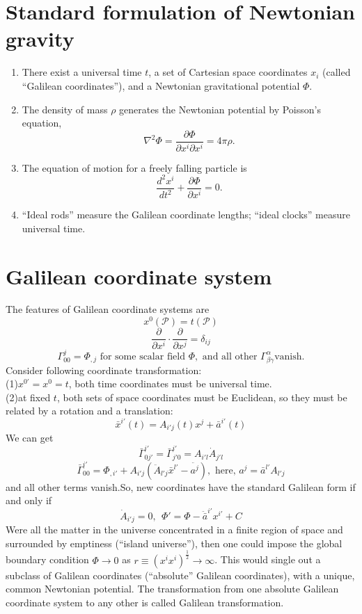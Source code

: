 \section{Standard formulation of Newtonian gravity}
\begin{enumerate}
\item There exist a universal time $t$, a set of Cartesian space coordinates $x_i$ (called ``Galilean coordinates''), and a Newtonian gravitational potential $\Phi$.
\item  The density of mass $\rho$ generates the Newtonian potential by Poisson's equation,
\[\nabla^2\Phi = \frac{\partial \Phi}{\partial x^i \partial x^i} = 4\pi\rho.\]
\item  The equation of motion for a freely falling particle is
\[\frac{d^2 x^i}{dt^2} + \frac{\partial \Phi}{\partial x^i} =0 .\]
\item  ``Ideal rods'' measure the Galilean coordinate lengths; ``ideal clocks'' measure universal time.
\end{enumerate}

\section{Galilean coordinate system}
\noindent
The features of Galilean coordinate systems are
\[x^0(\mathcal{P}) = t(\mathcal{P})\]
\[\frac{\partial}{\partial x^i} \cdot \frac{\partial}{\partial x^j} = \delta_{ij}\]
\[\Gamma^j_{00} = \Phi_{,j} \mbox{ for some scalar field }\Phi,\mbox{ and all other } \Gamma^{\alpha}_{\beta \gamma} \mbox{vanish.}\]
Consider following coordinate transformation:\\
(1)$x^{0'}=x^0=t$, both time coordinates must be universal time.\\
(2)at fixed $t$, both sets of space coordinates must be Euclidean, so they must be related by a rotation and a translation:
\[\bar{x}^{i'}(t) = A_{i'j}(t)x^j + \bar{a}^{i'}(t)\]
We can get
\[\bar{\Gamma}^{i'}_{0j'} = \bar{\Gamma}^{i'}_{j'0} = A_{i'l}\dot{A}_{j'l}\]
\[\bar{\Gamma}^{i'}_{00} = \Phi_{,i'} + A_{i'j}(\ddot{A}_{l'j}\bar{x}^{l'}-\ddot{a^{j}}), \mbox{   here, }a^{j} = \bar{a}^{l'}A_{l'j}\]
and all other terms vanish.So, new coordinates have the standard Galilean form  if and only if
\[\dot{A}_{i'j}=0,\ \ \Phi'=\Phi-\ddot{\bar{a}}^{i'}x^{i'}+C\]
Were all the matter in the universe concentrated in a finite region of space and surrounded by emptiness (``island universe''), then one could impose the global boundary condition $\Phi \to 0$ as $r \equiv (x^ix^i)^{\frac{1}{2}} \to \infty$. This would single out a subclass of Galilean coordinates (``absolute'' Galilean coordinates), with a unique, common Newtonian potential. 
The transformation from one absolute Galilean coordinate system to any other is called Galilean transformation.

